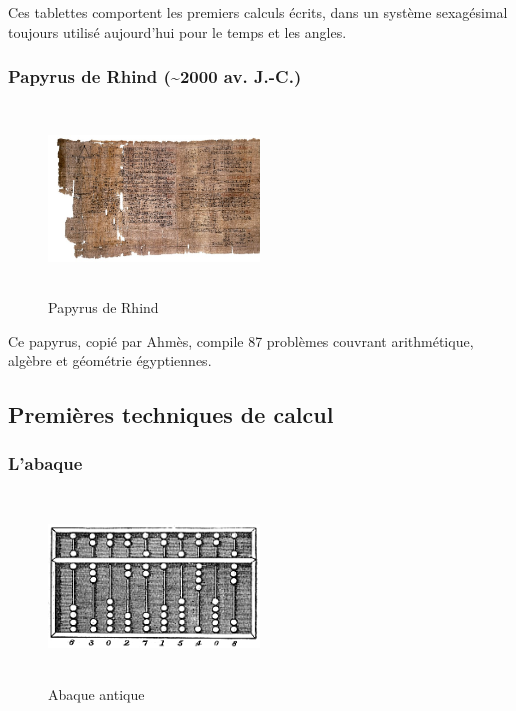 \documentclass[11pt]{article}
\begin{document}
Ces tablettes comportent les premiers calculs écrits, dans un système
sexagésimal toujours utilisé aujourd’hui pour le temps et les angles.




\subsubsection{Papyrus de Rhind (\textasciitilde{}2000 av. J.-C.)}
\label{sec:org7aeabce}

\begin{figure}[htbp]
\centering
\includegraphics[width=0.5\textwidth,height=5cm]{./images/Rhind-Papyrus.jpg}
\caption{Papyrus de Rhind}
\end{figure}

Ce papyrus, copié par Ahmès, compile 87 problèmes couvrant
arithmétique, algèbre et géométrie égyptiennes.


\newpage


\subsection{Premières techniques de calcul}
\label{sec:orgfd30115}

\subsubsection{L’abaque}
\label{sec:org089dc51}

\begin{figure}[htbp]
\centering
\includegraphics[width=0.5\textwidth,height=5cm]{./images/Abacus.png}
\caption{Abaque antique}
\end{figure}
\end{document}
